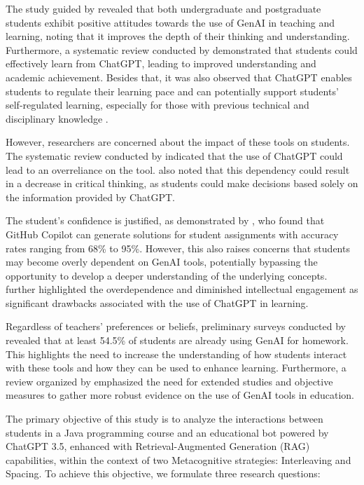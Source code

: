 \documentclass[a4paper,twoside]{article}
\begin{document}
The study guided by \cite{chan23} revealed that both undergraduate and
postgraduate students exhibit positive attitudes towards the use of GenAI in
teaching and learning, noting that it improves the depth of their thinking and
understanding. Furthermore, a systematic review conducted by \cite{Lo24}
demonstrated that students could effectively learn from ChatGPT, leading to
improved understanding and academic achievement. Besides that, it was also
observed that ChatGPT enables students to regulate their learning pace
\citep{Baha24} and can potentially support students’ self-regulated learning,
especially for those with previous technical and disciplinary knowledge
\citep{Xia23}.

However, researchers are concerned about the impact of these tools on
students. The systematic review conducted by \cite{Murillo23} indicated that
the use of ChatGPT could lead to an overreliance on the tool. \cite{chan23} also
noted that this dependency could result in a decrease in critical thinking, as
students could make decisions based solely on the information provided by
ChatGPT.

The student’s confidence is justified, as demonstrated by \cite{Puryear22}, who
found that GitHub Copilot can generate solutions for student assignments with
accuracy rates ranging from 68\% to 95\%. However, this also raises concerns
that students may become overly dependent on GenAI tools, potentially bypassing
the opportunity to develop a deeper understanding of the underlying concepts.
\cite{cai23} further highlighted the overdependence and diminished intellectual
engagement as significant drawbacks associated with the use of ChatGPT in
learning.

Regardless of teachers' preferences or beliefs, preliminary surveys conducted
by \cite{Dickey24} revealed that at least 54.5\% of students are already using
GenAI for homework. This highlights the need to increase the understanding of
how students interact with these tools and how they can be used to
enhance learning. Furthermore, a review organized by \cite{Lo24} emphasized the
need for extended studies and objective measures to gather more robust
evidence on the use of GenAI tools in education.

The primary objective of this study is to analyze the interactions between
students in a Java programming course and an educational bot powered by
ChatGPT 3.5, enhanced with Retrieval-Augmented Generation (RAG) capabilities,
within the context of two Metacognitive strategies: Interleaving and Spacing.
To achieve this objective, we formulate three research questions:
\end{document}

